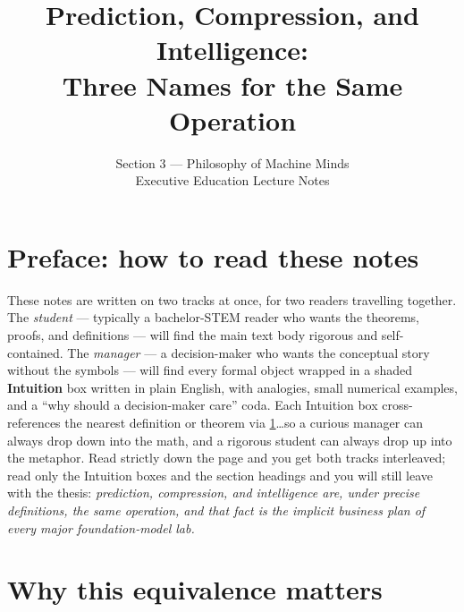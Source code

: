 \documentclass[12pt,a4paper]{article}
\title{Prediction, Compression, and Intelligence:\\
       Three Names for the Same Operation}
\author{Section 3 --- Philosophy of Machine Minds\\
        Executive Education Lecture Notes}
\date{}
\theoremstyle{plain}
\theoremstyle{definition}
\begin{document}
\maketitle

\section*{Preface: how to read these notes}

These notes are written on two tracks at once, for two readers travelling
together.  The \emph{student} --- typically a bachelor-STEM reader who
wants the theorems, proofs, and definitions --- will find the main text
body rigorous and self-contained.  The \emph{manager} --- a
decision-maker who wants the conceptual story without the symbols ---
will find every formal object wrapped in a shaded \textbf{Intuition}
box written in plain English, with analogies, small numerical examples,
and a ``why should a decision-maker care'' coda.  Each Intuition box
cross-references the nearest definition or theorem via
\cref{sec:why}\ldots so a curious manager can always drop down into
the math, and a rigorous student can always drop up into the metaphor.
Read strictly down the page and you get both tracks interleaved; read
only the Intuition boxes and the section headings and you will still
leave with the thesis: \emph{prediction, compression, and intelligence
are, under precise definitions, the same operation, and that fact is
the implicit business plan of every major foundation-model lab.}

\tableofcontents
\newpage

\section{Why this equivalence matters}
\label{sec:why}
\end{document}
